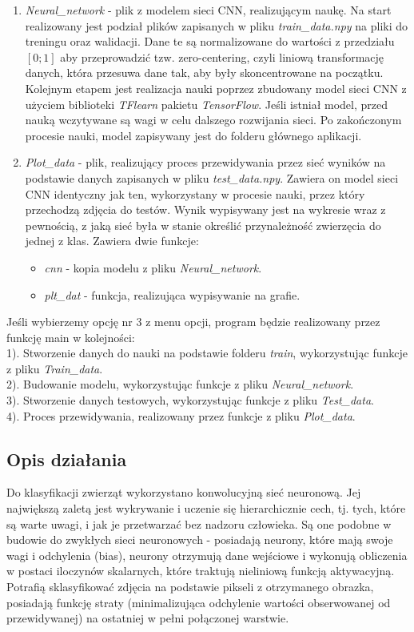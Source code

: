 \documentclass[12pt,a4paper]{article}
\begin{document}
\begin{enumerate}
        	\item \textit{Neural\_network} - plik z modelem sieci CNN, realizującym naukę. Na start realizowany jest podział plików zapisanych w pliku \textit{train\_data.npy} na pliki do treningu oraz walidacji. Dane te są normalizowane do wartości z przedziału $[0; 1]$ aby przeprowadzić tzw. zero-centering, czyli liniową transformację danych, która przesuwa dane tak, aby były skoncentrowane na początku. Kolejnym etapem jest realizacja nauki poprzez zbudowany model sieci CNN z użyciem biblioteki \textit{TFlearn} pakietu \textit{TensorFlow}. Jeśli istniał model, przed nauką wczytywane są wagi w celu dalszego rozwijania sieci. Po zakończonym procesie nauki, model zapisywany jest do folderu głównego aplikacji.
        	\item \textit{Plot\_data} - plik, realizujący proces przewidywania przez sieć wyników na podstawie danych zapisanych w pliku \textit{test\_data.npy}. Zawiera on model sieci CNN identyczny jak ten, wykorzystany w procesie nauki, przez który przechodzą zdjęcia do testów. Wynik wypisywany jest na wykresie wraz z pewnością, z jaką sieć była w stanie określić przynależność zwierzęcia do jednej z klas. Zawiera dwie funkcje:
        	\begin{itemize}
        	    \item \textit{cnn} - kopia modelu z pliku \textit{Neural\_network}.
        	    \item \textit{plt\_dat} - funkcja, realizująca wypisywanie na grafie.
        	\end{itemize}
    	\end{enumerate}
    Jeśli wybierzemy opcję nr 3 z menu opcji, program będzie realizowany przez funkcję main w kolejności:\\
    1). Stworzenie danych do nauki na podstawie folderu \textit{train}, wykorzystując funkcje z pliku \textit{Train\_data}.\\
    2). Budowanie modelu, wykorzystując funkcje z pliku \textit{Neural\_network}.\\
    3). Stworzenie danych testowych, wykorzystując funkcje z pliku \textit{Test\_data}.\\
    4). Proces przewidywania, realizowany przez funkcje z pliku \textit{Plot\_data}.
	
	\subsection{Opis działania}
	
    Do klasyfikacji zwierząt wykorzystano konwolucyjną sieć neuronową. Jej największą zaletą jest wykrywanie i uczenie się hierarchicznie cech, tj. tych, które są warte uwagi, i jak je przetwarzać bez nadzoru człowieka. Są one podobne w budowie do zwykłych sieci neuronowych - posiadają neurony, które mają swoje wagi i odchylenia (bias), neurony otrzymują dane wejściowe i wykonują obliczenia w postaci iloczynów skalarnych, które traktują nieliniową funkcją aktywacyjną. Potrafią sklasyfikować zdjęcia na podstawie pikseli z otrzymanego obrazka, posiadają funkcję straty (minimalizująca odchylenie wartości obserwowanej od przewidywanej) na ostatniej w pełni połączonej warstwie.
    \\
    
\end{document}

